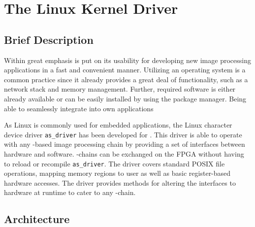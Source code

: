 


\section{The Linux Kernel Driver} \label{ch:04-05-software-linux}



\subsection{Brief Description}

Within \asterics great emphasis is put on its usability for developing new image processing applications in a fast and convenient manner.
Utilizing an operating system is a common practice since it already provides a great deal of functionality, such as a network stack and memory management.
Further, required software is either already available or can be easily installed by using the package manager.
Being able to seamlessly integrate \asterics into own applications

As Linux is commonly used for embedded applications, the Linux character device driver \texttt{as\_driver} has been developed for \asterics.
This driver is able to operate with any \asterics-based image processing chain by providing a set of interfaces between hardware and software.
\asterics-chains can be exchanged on the FPGA without having to reload or recompile \texttt{as\_driver}.
The driver covers standard POSIX file operations, mapping memory regions to user as well as basic register-based hardware accesses.
The driver provides methods for altering the interfaces to hardware at runtime to cater to any \asterics-chain.


\subsection{Architecture}

